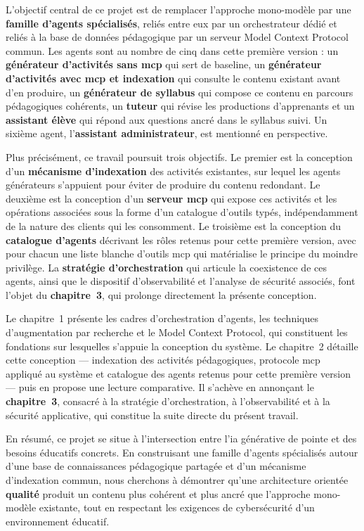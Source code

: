 L'objectif central de ce projet est de remplacer l'approche
mono-modèle par une \textbf{famille d'agents spécialisés}, reliés
entre eux par un orchestrateur dédié et reliés à la base de
données pédagogique par un serveur Model Context Protocol commun.
Les agents sont au nombre de cinq dans cette première version :
un \textbf{générateur d'activités sans \gls{mcp}} qui sert de
baseline, un \textbf{générateur d'activités avec \gls{mcp} et
indexation} qui consulte le contenu existant avant d'en produire,
un \textbf{générateur de syllabus} qui compose ce contenu en
parcours pédagogiques cohérents, un \textbf{tuteur} qui révise
les productions d'apprenants et un \textbf{assistant élève} qui
répond aux questions ancré dans le syllabus suivi. Un sixième
agent, l'\textbf{assistant administrateur}, est mentionné en
perspective.

Plus précisément, ce travail poursuit trois objectifs. Le
premier est la conception d'un \textbf{mécanisme d'indexation}
des activités existantes, sur lequel les agents générateurs
s'appuient pour éviter de produire du contenu redondant. Le
deuxième est la conception d'un \textbf{serveur \gls{mcp}} qui
expose ces activités et les opérations associées sous la forme
d'un catalogue d'outils typés, indépendamment de la nature des
clients qui les consomment. Le troisième est la conception du
\textbf{catalogue d'agents} décrivant les rôles retenus pour
cette première version, avec pour chacun une liste blanche
d'outils \gls{mcp} qui matérialise le principe du moindre
privilège. La \textbf{stratégie d'orchestration} qui articule la
coexistence de ces agents, ainsi que le dispositif d'observabilité
et l'analyse de sécurité associés, font l'objet du
\textbf{chapitre~3}, qui prolonge directement la présente conception.

Le chapitre~1 présente les cadres d'orchestration d'agents, les
techniques d'augmentation par recherche et le Model Context
Protocol, qui constituent les fondations sur lesquelles s'appuie la
conception du système. Le chapitre~2 détaille cette conception —
indexation des activités pédagogiques, protocole \gls{mcp} appliqué
au système et catalogue des agents retenus pour cette première
version — puis en propose une lecture comparative. Il s'achève en
annonçant le \textbf{chapitre~3}, consacré à la stratégie
d'orchestration, à l'observabilité et à la sécurité applicative,
qui constitue la suite directe du présent travail.

En résumé, ce projet se situe à l'intersection entre l'\gls{ia}
générative de pointe et des besoins éducatifs concrets. En
construisant une famille d'agents spécialisés autour d'une base
de connaissances pédagogique partagée et d'un mécanisme
d'indexation commun, nous cherchons à démontrer qu'une
architecture orientée \textbf{qualité} produit un contenu plus
cohérent et plus ancré que l'approche mono-modèle existante,
tout en respectant les exigences de cybersécurité d'un
environnement éducatif.
\newpage
